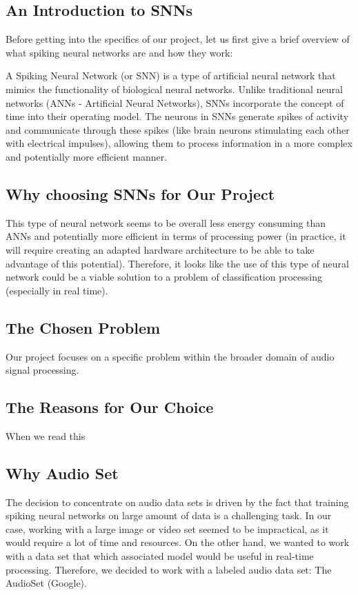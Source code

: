 \documentclass{article}
\begin{document}
\subsection{An Introduction to SNNs}

Before getting into the specifics of our project, let us first give a brief overview of what spiking neural networks are and how they work:

A Spiking Neural Network (or SNN) is a type of artificial neural network that mimics the functionality of biological neural networks. Unlike traditional neural networks (ANNs - Artificial Neural Networks), SNNs incorporate the concept of time into their operating model. The neurons in SNNs generate spikes of activity and communicate through these spikes (like brain neurons stimulating each other with electrical impulses), allowing them to process information in a more complex and potentially more efficient manner.


\subsection{Why choosing SNNs for Our Project}

This type of neural network seems to be overall less energy consuming than ANNs and potentially more efficient in terms of processing power (in practice, it will require creating an adapted hardware architecture to be able to take advantage of this potential). Therefore, it looks like the use of this type of neural network could be a viable solution to a problem of classification processing (especially in real time).

\subsection{The Chosen Problem}

Our project focuses on a specific problem within the broader domain of audio signal processing.

\subsection{The Reasons for Our Choice}

When we read this


\subsection{Why Audio Set}

The decision to concentrate on audio data sets is driven by the fact that training spiking neural networks on large amount of data is a challenging task. In our case, working with a large image or video set seemed to be impractical, as it would require a lot of time and resources. On the other hand, we wanted to work with a data set that which associated model would be useful in real-time processing. Therefore, we decided to work with a labeled audio data set: The AudioSet (Google).
\end{document}
